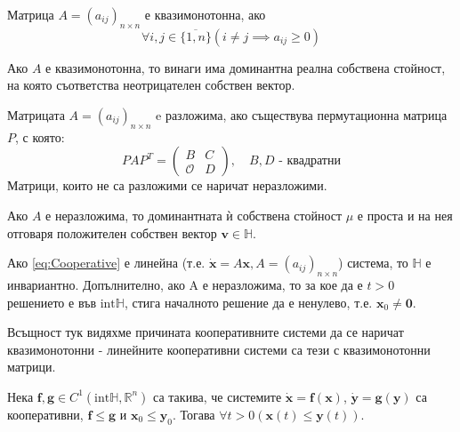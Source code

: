 \begin{definition}
  Матрица $A=(a_{ij})_{n \times n}$ е квазимонотонна, ако
  \begin{equation*}
    \forall{i,j \in \{\overline{1,n}\}} \left(i \neq j \implies a_{ij} \geq 0\right)
  \end{equation*}
\end{definition}

\begin{theorem}
  Ако $A$ е квазимонотонна, то винаги има доминантна реална собствена стойност, на която съответства неотрицателен собствен вектор.
\end{theorem}

\begin{definition}
  Матрицата $A=(a_{ij})_{n \times n}$ e разложима, ако съществува пермутационна матрица $P$, с която:
  \begin{equation*}
    PAP^T =
    \begin{pmatrix}
      B & C \\
      \mathscr{O} & D
    \end{pmatrix}, \quad B, D \text{ - квадратни}
  \end{equation*}
  Матрици, които не са разложими се наричат неразложими.
\end{definition}

\begin{theorem}
  Ако $A$ е неразложима, то доминантната ѝ собствена стойност $\mu$ е проста и на нея отговаря положителен собствен вектор $\mathbf{v} \in \mathbb{H}$.
\end{theorem}

\begin{theorem}
  Ако \eqref{eq:Cooperative} е линейна (т.е. $\dot{\mathbf{x}} = A \mathbf{x}, A = (a_{ij})_{n \times n}$) система, то $\mathbb{H}$ е инвариантно. Допълнително, ако A е неразложима, то за кое да е $t > 0$ решението е във $\mathrm{int} \mathbb{H}$, стига началното решение да е ненулево, т.е. $\mathbf{x}_0 \neq \mathbf{0}$.
\end{theorem}

Всъщност тук видяхме причината кооперативните системи да се наричат квазимонотонни - линейните кооперативни системи са тези с квазимонотонни матрици.

\begin{theorem}
  \label{thm:Comparison}
  Нека $\mathbf{f}, \mathbf{g} \in C^1(\mathrm{int} \mathbb{H}, \mathbb{R}^n)$ са такива, че системите $\dot{\mathbf{x}}=\mathbf{f}(\mathbf{x})$, $\dot{\mathbf{y}}=\mathbf{g}(\mathbf{y})$ са кооперативни, $\mathbf{f} \leq \mathbf{g}$ и $\mathbf{x}_0 \leq \mathbf{y}_0$. Тогава $\forall{t>0}(\mathbf{x}(t) \leq \mathbf{y}(t))$.
\end{theorem}

